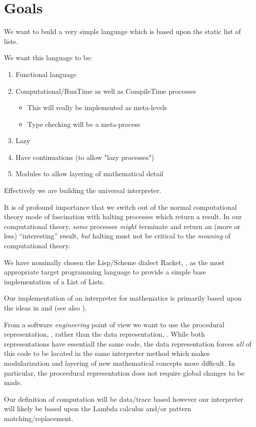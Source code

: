
\section{Goals}

We want to build a very simple language which is based upon the static 
list of lists.

We want this language to be:
\begin{enumerate}
\item Functional language
\item Computational/RunTime as well as CompileTime processes
  \begin{itemize}
  \item This will really be implemented as meta-levels
  \item Type checking will be a meta-process
  \end{itemize}
\item Lazy
\item Have continuations (to allow "lazy processes")
\item Modules to allow layering of mathematical detail
\end{enumerate}

Effectively we are building the universal interpreter.

It is of profound importance that we switch out of the normal computational
theory mode of fascination with halting processes which return a result.  In our
computational theory, \emph{some} processes \emph{might} terminate and return an
(more or less) ``interesting'' result, \emph{but} halting must not be critical to the
\emph{meaning} of computational theory.

We have nominally chosen the Lisp/Scheme dialect Racket,
\cite{racket2016racket}, as the most appropriate target programming language to
provide a simple base implementation of a List of Lists.

Our implementation of an interpreter for mathematics is primarily based upon the
ideas in \cite{friedmanWand2008essentialsProgrammingLanguages} and
\cite{krishnamurthi2007programmingLanguagesApplicationInterpretation} (see also
\cite{krishnamurthi2012programmingLanguagesApplicationInterpretation}).

From a software \emph{engineering} point of view we want to use the procedural
representation, \cite[section
2.2.3]{friedmanWand2008essentialsProgrammingLanguages}, rather than the data
representation, \cite[section
2.2.2]{friedmanWand2008essentialsProgrammingLanguages}. While both
representations have essentiall the same code, the data representation forces
\emph{all} of this code to be located in the same interpreter method which makes
modularization and layering of new mathematical concepts more difficult. In
particular, the proceedural representation does not require global changes to be
made.

Our definition of computation will be data/trace based however our interpreter
will likely be based upon the Lambda calculus and/or pattern
matching/replacement. 
